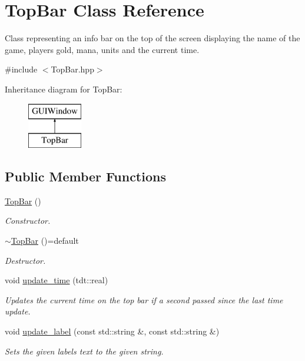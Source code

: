 \hypertarget{class_top_bar}{}\section{Top\+Bar Class Reference}
\label{class_top_bar}


Class representing an info bar on the top of the screen displaying the name of the game, player\textquotesingle{}s gold, mana, units and the current time.  




{\ttfamily \#include $<$Top\+Bar.\+hpp$>$}

Inheritance diagram for Top\+Bar\+:\begin{figure}[H]
\begin{center}
\leavevmode
\includegraphics[height=2.000000cm]{class_top_bar}
\end{center}
\end{figure}
\subsection*{Public Member Functions}
\begin{DoxyCompactItemize}
\item 
\hyperlink{class_top_bar_a63a533082a600995f786866cc49b1430}{Top\+Bar} ()
\begin{DoxyCompactList}\small\item\em Constructor. \end{DoxyCompactList}\item 
\hyperlink{class_top_bar_a7094a6ca99beead40e96a29d1a5d0db3}{$\sim$\+Top\+Bar} ()=default
\begin{DoxyCompactList}\small\item\em Destructor. \end{DoxyCompactList}\item 
void \hyperlink{class_top_bar_a8641f2accd0f13d2262669914582cb69}{update\+\_\+time} (tdt\+::real)
\begin{DoxyCompactList}\small\item\em Updates the current time on the top bar if a second passed since the last time update. \end{DoxyCompactList}\item 
void \hyperlink{class_top_bar_a3d83b2b0b1b91e30a275bfb1f7256dba}{update\+\_\+label} (const std\+::string \&, const std\+::string \&)
\begin{DoxyCompactList}\small\item\em Sets the given label\textquotesingle{}s text to the given string. \end{DoxyCompactList}\end{DoxyCompactItemize}
